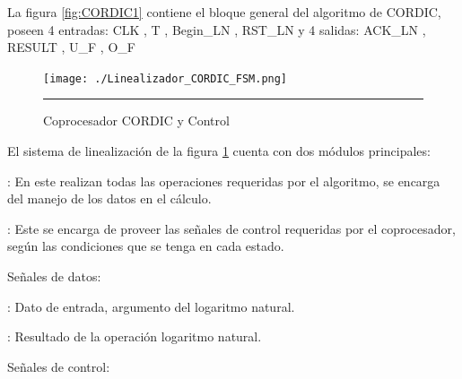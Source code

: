 La figura \ref{fig:CORDIC1} contiene el bloque general del algoritmo de CORDIC, poseen 4 entradas: CLK , T , Begin\_LN , RST\_LN y 4 salidas: ACK\_LN , RESULT , U\_F , O\_F

\begin{figure}[H]
  \centering
    \texttt{[image: ./Linealizador\_CORDIC\_FSM.png]}
    \rule{35em}{0.5pt}
  \caption[Coprocesador CORDIC y Control]{Coprocesador CORDIC y Control  }
  \label{fig:CORDIC2}
\end{figure}

El sistema de linealización de la figura \ref{fig:CORDIC2} cuenta con dos módulos principales: 

\begin{compactitem}

\item {}: En este realizan todas las operaciones requeridas por el algoritmo, se encarga del manejo de los datos en el cálculo. 


\item {}: Este se encarga de proveer las señales de control requeridas por el coprocesador, según las condiciones que se tenga en cada estado.

\end{compactitem}

Señales de datos: 

\begin{compactitem}

\item {}: Dato de entrada, argumento del logaritmo natural. 
\item {}: Resultado de la operación logaritmo natural.

\end{compactitem}

Señales de control: 

